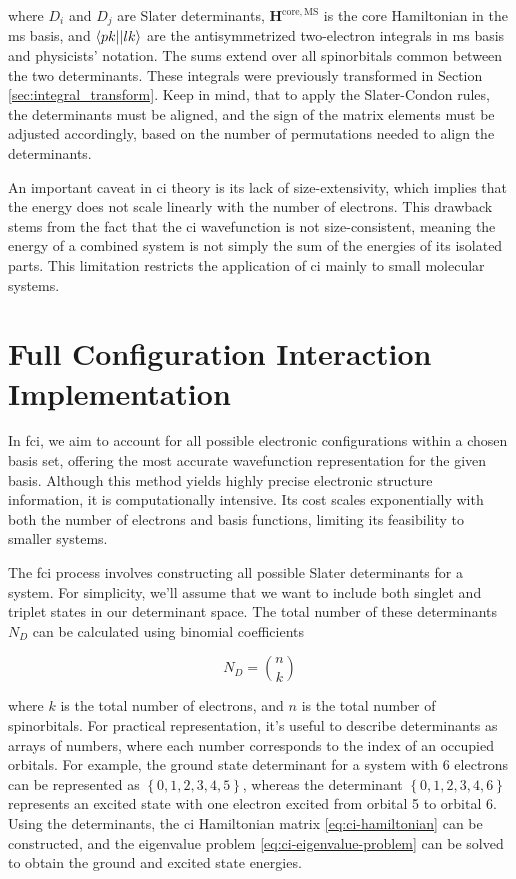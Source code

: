 where \(D_i\) and \(D_j\) are Slater determinants, \(\mathbf{H}^{\mathrm{core},\mathrm{MS}}\) is the core Hamiltonian in the \acrshort{ms} basis, and \(\braket{pk||lk}\) are the antisymmetrized two-electron integrals in \acrshort{ms} basis and physicists' notation. The sums extend over all spinorbitals common between the two determinants. These integrals were previously transformed in Section \ref{sec:integral_transform}. Keep in mind, that to apply the Slater-Condon rules, the determinants must be aligned, and the sign of the matrix elements must be adjusted accordingly, based on the number of permutations needed to align the determinants.

An important caveat in \acrshort{ci} theory is its lack of size-extensivity, which implies that the energy does not scale linearly with the number of electrons. This drawback stems from the fact that the \acrshort{ci} wavefunction is not size-consistent, meaning the energy of a combined system is not simply the sum of the energies of its isolated parts. This limitation restricts the application of \acrshort{ci} mainly to small molecular systems.

\section{Full Configuration Interaction Implementation}

In \acrshort{fci}, we aim to account for all possible electronic configurations within a chosen basis set, offering the most accurate wavefunction representation for the given basis. Although this method yields highly precise electronic structure information, it is computationally intensive. Its cost scales exponentially with both the number of electrons and basis functions, limiting its feasibility to smaller systems.

The \acrshort{fci} process involves constructing all possible Slater determinants for a system. For simplicity, we'll assume that we want to include both singlet and triplet states in our determinant space. The total number of these determinants \(N_D\) can be calculated using binomial coefficients

\begin{equation}
N_D=\binom{n}{k}
\end{equation}

where \(k\) is the total number of electrons, and \(n\) is the total number of spinorbitals. For practical representation, it's useful to describe determinants as arrays of numbers, where each number corresponds to the index of an occupied orbitals. For example, the ground state determinant for a system with 6 electrons can be represented as \(\left\lbrace 0,1,2,3,4,5\right\rbrace\), whereas the determinant \(\left\lbrace 0,1,2,3,4,6\right\rbrace\) represents an excited state with one electron excited from orbital 5 to orbital 6. Using the determinants, the \acrshort{ci} Hamiltonian matrix \eqref{eq:ci-hamiltonian} can be constructed, and the eigenvalue problem \eqref{eq:ci-eigenvalue-problem} can be solved to obtain the ground and excited state energies.

